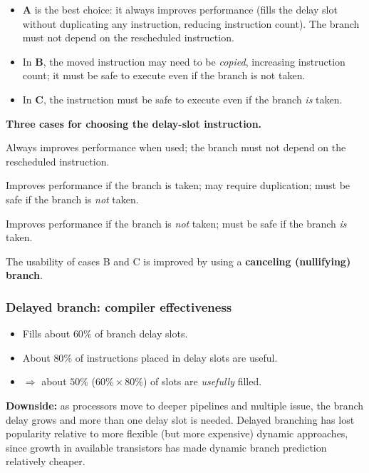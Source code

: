 \begin{itemize}
  \item \textbf{A} is the best choice: it always improves performance
  (fills the delay slot without duplicating any instruction, reducing
  instruction count). The branch must not depend on the rescheduled
  instruction.
  \item In \textbf{B}, the moved instruction may need to be \emph{copied},
  increasing instruction count; it must be safe to execute even if the
  branch is not taken.
  \item In \textbf{C}, the instruction must be safe to execute even if the
  branch \emph{is} taken.
\end{itemize}

\textbf{Three cases for choosing the delay-slot instruction.}
\begin{description}[leftmargin=2.2cm,style=nextline]
  \item[A -- independent instruction from before the branch (\emph{common})]
  Always improves performance when used; the branch must not depend on the
  rescheduled instruction.
  \item[B -- instruction from the branch target] Improves performance if
  the branch is taken; may require duplication; must be safe if the branch
  is \emph{not} taken.
  \item[C -- instruction from the fall-through stream] Improves performance
  if the branch is \emph{not} taken; must be safe if the branch \emph{is}
  taken.
\end{description}
\begin{remark}
The usability of cases B and C is improved by using a \textbf{canceling
(nullifying) branch}.
\end{remark}

\subsubsection{Delayed branch: compiler effectiveness}

\begin{itemize}
  \item Fills about $60\%$ of branch delay slots.
  \item About $80\%$ of instructions placed in delay slots are useful.
  \item $\Rightarrow$ about $50\%$ ($60\%\times80\%$) of slots are
  \emph{usefully} filled.
\end{itemize}
\begin{remark}
\textbf{Downside:} as processors move to deeper pipelines and multiple
issue, the branch delay grows and more than one delay slot is needed.
Delayed branching has lost popularity relative to more flexible (but more
expensive) dynamic approaches, since growth in available transistors has
made dynamic branch prediction relatively cheaper.
\end{remark}

